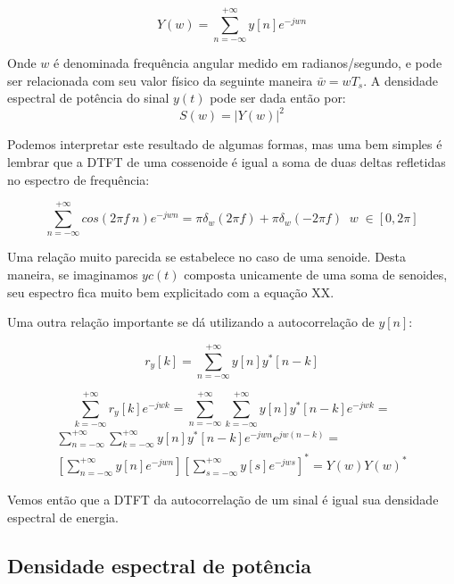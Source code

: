 \documentclass[a4paper, 12pt]{book}
\begin{document}
\begin{equation}
	Y(w)=\sum_{n=-\infty}^{+\infty}y[n]e^{-jwn}
\end{equation}

Onde $w$ é denominada frequência angular medido em radianos/segundo, e pode ser relacionada com seu valor físico da seguinte maneira $\bar{w}=wT_s$. A densidade espectral de potência do sinal $y(t)$ pode ser dada então por:
\begin{equation}
	S(w)=|Y(w)|^2
\end{equation}

Podemos interpretar este resultado de algumas formas, mas uma bem simples é lembrar que a DTFT de uma cossenoide é igual a soma de duas deltas refletidas no espectro de frequência:

\begin{equation}
	\sum_{n=-\infty}^{+\infty}cos(2\pi f \: n)e^{-jwn}= \pi \delta_{w}(2\pi f) + \pi \delta_{w}(-2\pi f) \;\; w \; \in [0,2 \pi]
\end{equation}

Uma relação muito parecida se estabelece no caso de uma senoide. Desta maneira, se imaginamos $yc(t)$ composta unicamente de uma soma de senoides, seu espectro fica muito bem explicitado com a equação XX.

Uma outra relação importante se dá utilizando a autocorrelação de $y[n]$:

\begin{equation}
r_y[k]=\sum_{n=-\infty}^{+\infty}y[n]y^*[n-k]
\end{equation}

\begin{equation*}
\sum_{k=-\infty}^{+\infty}r_y[k]e^{-jwk}=\sum_{n=-\infty}^{+\infty}\sum_{k=-\infty}^{+\infty}y[n]y^*[n-k]e^{-jwk}=
\end{equation*}
\begin{equation}
\begin{aligned}
\sum_{n=-\infty}^{+\infty}\sum_{k=-\infty}^{+\infty}y[n]y^*[n-k]e^{-jwn}e^{jw(n-k)}  = \\ \left[\sum_{n=-\infty}^{+\infty}y[n]e^{-jwn} \right]  \left[\sum_{s=-\infty}^{+\infty}y[s]e^{-jws} \right]^* = Y(w)Y(w)^*
\end{aligned}
\end{equation}

Vemos então que a DTFT da autocorrelação de um sinal é igual sua densidade espectral de energia.

\subsection{Densidade espectral de potência}
\end{document}
